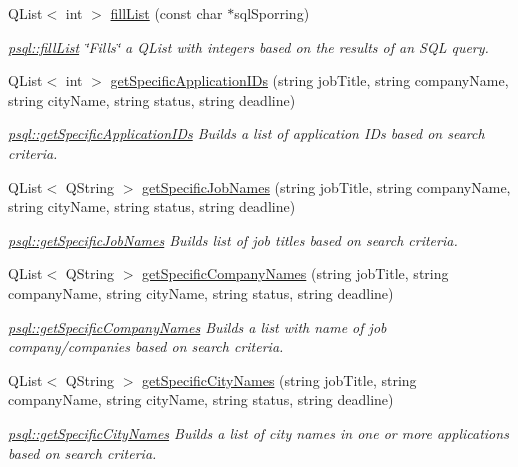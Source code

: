 \begin{DoxyCompactItemize}
Q\+List$<$ int $>$ \hyperlink{classpsql_a9a3082a159c962dfcd84e23930f5619b}{fill\+List} (const char $\ast$sql\+Sporring)
\begin{DoxyCompactList}\small\item\em \hyperlink{classpsql_a9a3082a159c962dfcd84e23930f5619b}{psql\+::fill\+List} \char`\"{}\+Fills\char`\"{} a Q\+List with integers based on the results of an S\+QL query. \end{DoxyCompactList}\item 
Q\+List$<$ int $>$ \hyperlink{classpsql_ae262aec447273444deeda34113361e21}{get\+Specific\+Application\+I\+Ds} (string job\+Title, string company\+Name, string city\+Name, string status, string deadline)
\begin{DoxyCompactList}\small\item\em \hyperlink{classpsql_ae262aec447273444deeda34113361e21}{psql\+::get\+Specific\+Application\+I\+Ds} Builds a list of application I\+Ds based on search criteria. \end{DoxyCompactList}\item 
Q\+List$<$ Q\+String $>$ \hyperlink{classpsql_a62b208d687607bd78a6502444cecced8}{get\+Specific\+Job\+Names} (string job\+Title, string company\+Name, string city\+Name, string status, string deadline)
\begin{DoxyCompactList}\small\item\em \hyperlink{classpsql_a62b208d687607bd78a6502444cecced8}{psql\+::get\+Specific\+Job\+Names} Builds list of job titles based on search criteria. \end{DoxyCompactList}\item 
Q\+List$<$ Q\+String $>$ \hyperlink{classpsql_a47a1c719a9014f94706fdce665fdf21c}{get\+Specific\+Company\+Names} (string job\+Title, string company\+Name, string city\+Name, string status, string deadline)
\begin{DoxyCompactList}\small\item\em \hyperlink{classpsql_a47a1c719a9014f94706fdce665fdf21c}{psql\+::get\+Specific\+Company\+Names} Builds a list with name of job company/companies based on search criteria. \end{DoxyCompactList}\item 
Q\+List$<$ Q\+String $>$ \hyperlink{classpsql_ae337317b29abd16f3a52467d978b04ea}{get\+Specific\+City\+Names} (string job\+Title, string company\+Name, string city\+Name, string status, string deadline)
\begin{DoxyCompactList}\small\item\em \hyperlink{classpsql_ae337317b29abd16f3a52467d978b04ea}{psql\+::get\+Specific\+City\+Names} Builds a list of city names in one or more applications based on search criteria. \end{DoxyCompactList}\item 

\end{DoxyCompactItemize}
